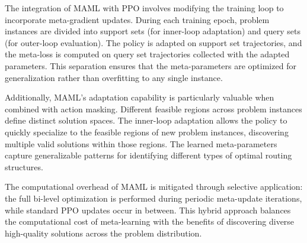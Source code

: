 The integration of MAML with PPO involves modifying the training loop to incorporate meta-gradient updates. During each training epoch, problem instances are divided into support sets (for inner-loop adaptation) and query sets (for outer-loop evaluation). The policy is adapted on support set trajectories, and the meta-loss is computed on query set trajectories collected with the adapted parameters. This separation ensures that the meta-parameters are optimized for generalization rather than overfitting to any single instance.

Additionally, MAML's adaptation capability is particularly valuable when combined with action masking. Different feasible regions across problem instances define distinct solution spaces. The inner-loop adaptation allows the policy to quickly specialize to the feasible regions of new problem instances, discovering multiple valid solutions within those regions. The learned meta-parameters capture generalizable patterns for identifying different types of optimal routing structures.

The computational overhead of MAML is mitigated through selective application: the full bi-level optimization is performed during periodic meta-update iterations, while standard PPO updates occur in between. This hybrid approach balances the computational cost of meta-learning with the benefits of discovering diverse high-quality solutions across the problem distribution.
